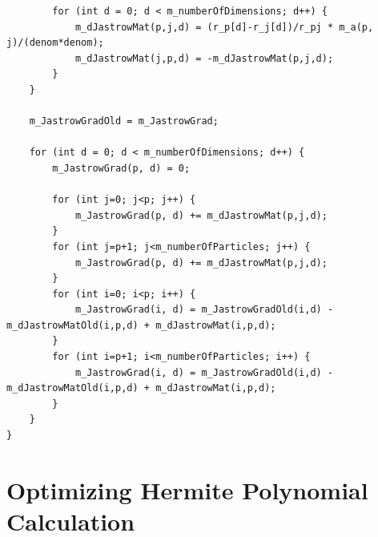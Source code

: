 \documentclass[../main.tex]{subfiles}
\begin{document}
\begin{lstlisting}
        for (int d = 0; d < m_numberOfDimensions; d++) {
            m_dJastrowMat(p,j,d) = (r_p[d]-r_j[d])/r_pj * m_a(p, j)/(denom*denom);
            m_dJastrowMat(j,p,d) = -m_dJastrowMat(p,j,d);
        }
    }

    m_JastrowGradOld = m_JastrowGrad;

    for (int d = 0; d < m_numberOfDimensions; d++) {
        m_JastrowGrad(p, d) = 0;

        for (int j=0; j<p; j++) {
            m_JastrowGrad(p, d) += m_dJastrowMat(p,j,d);
        }
        for (int j=p+1; j<m_numberOfParticles; j++) {
            m_JastrowGrad(p, d) += m_dJastrowMat(p,j,d);
        }
        for (int i=0; i<p; i++) {
            m_JastrowGrad(i, d) = m_JastrowGradOld(i,d) - m_dJastrowMatOld(i,p,d) + m_dJastrowMat(i,p,d);
        }
        for (int i=p+1; i<m_numberOfParticles; i++) {
            m_JastrowGrad(i, d) = m_JastrowGradOld(i,d) - m_dJastrowMatOld(i,p,d) + m_dJastrowMat(i,p,d);
        }
    }
}
\end{lstlisting}


\section{Optimizing Hermite Polynomial Calculation}\label{sec:Optimizing Hermite}
\end{document}

